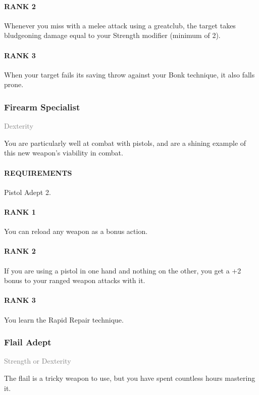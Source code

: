 \paragraph{RANK 2} Whenever you miss with a melee attack using a greatclub, the target takes bludgeoning damage equal to your Strength modifier (minimum of 2).
\paragraph{RANK 3} When your target fails its saving throw against your Bonk technique, it also falls prone.

\subsubsection{Firearm Specialist} \label{feat::firearmspecialist}
\small{\textcolor{gray}{Dexterity}}

\normalsize
You are particularly well at combat with pistols, and are a shining example of this new weapon's viability in combat.
\paragraph{REQUIREMENTS} Pistol Adept 2.
\paragraph{RANK 1} You can reload any weapon as a bonus action.
\paragraph{RANK 2} If you are using a pistol in one hand and nothing on the other, you get a +2 bonus to your ranged weapon attacks with it.
\paragraph{RANK 3} You learn the Rapid Repair technique.

\subsubsection{Flail Adept} \label{feat::flailadept}
\small{\textcolor{gray}{Strength or Dexterity}}

\normalsize
The flail is a tricky weapon to use, but you have spent countless hours mastering it.
